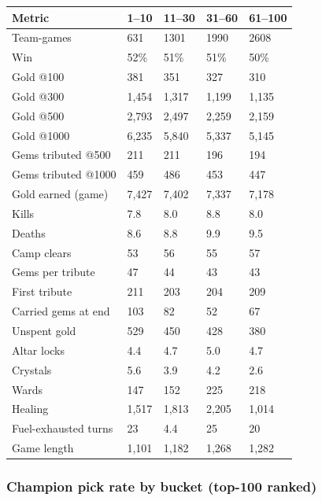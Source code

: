 \documentclass[
  10pt,
]{article}
\newcounter{none} %
\begin{document}
{\def\LTcaptype{none} %
\begin{longtable}[]{@{}lllll@{}}
\toprule\noalign{}
Metric & 1--10 & 11--30 & 31--60 & 61--100 \\
\midrule\noalign{}
\endhead
\bottomrule\noalign{}
\endlastfoot
Team-games & 631 & 1301 & 1990 & 2608 \\
Win & 52\% & 51\% & 51\% & 50\% \\
Gold @100 & 381 & 351 & 327 & 310 \\
Gold @300 & 1,454 & 1,317 & 1,199 & 1,135 \\
Gold @500 & 2,793 & 2,497 & 2,259 & 2,159 \\
Gold @1000 & 6,235 & 5,840 & 5,337 & 5,145 \\
Gems tributed @500 & 211 & 211 & 196 & 194 \\
Gems tributed @1000 & 459 & 486 & 453 & 447 \\
Gold earned (game) & 7,427 & 7,402 & 7,337 & 7,178 \\
Kills & 7.8 & 8.0 & 8.8 & 8.0 \\
Deaths & 8.6 & 8.8 & 9.9 & 9.5 \\
Camp clears & 53 & 56 & 55 & 57 \\
Gems per tribute & 47 & 44 & 43 & 43 \\
First tribute & 211 & 203 & 204 & 209 \\
Carried gems at end & 103 & 82 & 52 & 67 \\
Unspent gold & 529 & 450 & 428 & 380 \\
Altar locks & 4.4 & 4.7 & 5.0 & 4.7 \\
Crystals & 5.6 & 3.9 & 4.2 & 2.6 \\
Wards & 147 & 152 & 225 & 218 \\
Healing & 1,517 & 1,813 & 2,205 & 1,014 \\
Fuel-exhausted turns & 23 & 4.4 & 25 & 20 \\
Game length & 1,101 & 1,182 & 1,268 & 1,282 \\
\end{longtable}
}

\subsubsection{Champion pick rate by bucket (top-100
ranked)}\label{champion-pick-rate-by-bucket-top-100-ranked-1}
\end{document}
